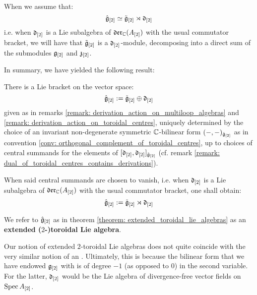         \begin{proposition} \label{prop: toroidal_lie_algebras_as_modules_over_div_0_vector_field_lie_algebras}
            When we assume that:
                $$\hat{\mathfrak{g}}_{[2]} \simeq \tilde{\mathfrak{g}}_{[2]} \rtimes \mathfrak{d}_{[2]}$$
            i.e. when $\mathfrak{d}_{[2]}$ is a Lie subalgebra of $\mathfrak{der}_{\mathbb{C}}(A_{[2]})$ with the usual commutator bracket, we will have that $\tilde{\mathfrak{g}}_{[2]}$ is a $\mathfrak{d}_{[2]}$-module, decomposing into a direct sum of the submodules $\mathfrak{g}_{[2]}$ and $\mathfrak{z}_{[2]}$. 
        \end{proposition}
        
        In summary, we have yielded the following result:
        \begin{theorem} \label{theorem: extended_toroidal_lie_algebras}
            There is a Lie bracket on the vector space:
                $$\hat{\mathfrak{g}}_{[2]} := \tilde{\mathfrak{g}}_{[2]} \oplus \mathfrak{d}_{[2]}$$
            given as in remarks \ref{remark: derivation_action_on_multiloop_algebras} and \ref{remark: derivation_action_on_toroidal_centres}, uniquely determined by the choice of an invariant non-degenerate symmetric $\mathbb{C}$-bilinear form $(-, -)_{\hat{\mathfrak{g}}_{[2]}}$ as in convention \ref{conv: orthogonal_complement_of_toroidal_centres}, up to choices of central summands for the elements of $[\mathfrak{d}_{[2]}, \mathfrak{d}_{[2]}]_{\hat{\mathfrak{g}}_{[2]}}$ (cf. remark \ref{remark: dual_of_toroidal_centres_contains_derivations}).

            When said central summands are chosen to vanish, i.e. when $\mathfrak{d}_{[2]}$ is a Lie subalgebra of $\mathfrak{der}_{\mathbb{C}}(A_{[2]})$ with the usual commutator bracket, one shall obtain:
                $$\hat{\mathfrak{g}}_{[2]} := \tilde{\mathfrak{g}}_{[2]} \rtimes \mathfrak{d}_{[2]}$$
        \end{theorem}
        \begin{definition} \label{def: extended_toroidal_lie_algebras}
            We refer to $\hat{\mathfrak{g}}_{[2]}$ as in theorem \ref{theorem: extended_toroidal_lie_algebras} as an \textbf{extended ($2$-)toroidal Lie algebra}. 
        \end{definition}
        \begin{remark}
            Our notion of extended $2$-toroidal Lie algebras does not quite coincide with the very similar notion of an . Ultimately, this is because the bilinear form that we have endowed $\mathfrak{g}_{[2]}$ with is of degree $-1$ (as opposed to $0$) in the second variable. For the latter, $\mathfrak{d}_{[2]}$ would be the Lie algebra of divergence-free vector fields on $\operatorname{Spec} A_{[2]}$.
        \end{remark}

